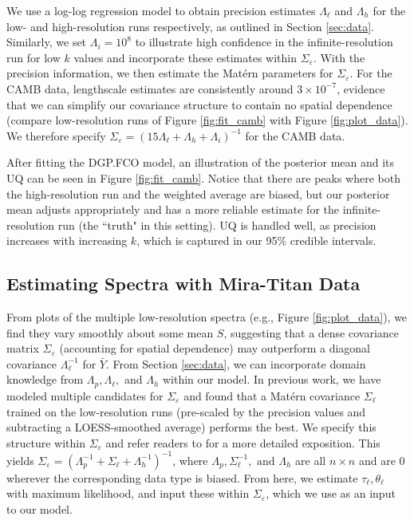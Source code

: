 \documentclass[11pt]{article}
\begin{document}
We use a log-log regression model to obtain precision estimates $\Lambda_\ell$ and $\Lambda_h$
for the low- and high-resolution runs respectively, as outlined in Section \ref{sec:data}. 
Similarly, we set $\Lambda_i=10^8$ to illustrate high confidence in the infinite-resolution 
run for low $k$ values and incorporate these estimates within $\Sigma_\varepsilon$. 
With the precision information, we then estimate the Mat\'ern parameters for 
$\Sigma_\varepsilon$. For the CAMB data, lengthscale estimates are consistently 
around $3\times 10^{-7}$, evidence that we can simplify our covariance structure 
to contain no spatial dependence (compare low-resolution runs of Figure \ref{fig:fit_camb} 
with Figure \ref{fig:plot_data}). We therefore specify $\Sigma_\varepsilon = 
(15\Lambda_\ell+\Lambda_h+\Lambda_i)^{-1}$ for the CAMB data.  

After fitting the DGP.FCO model, an illustration of the posterior mean and its UQ can
be seen in Figure \ref{fig:fit_camb}. Notice that there are peaks where both the high-resolution
run and the weighted average are biased, but our posterior mean adjusts appropriately 
and has a more reliable estimate for the infinite-resolution run (the ``truth" in this setting). 
UQ is handled well, as precision increases with increasing $k$, which is captured in our
95\% credible intervals.

\subsection{Estimating Spectra with Mira-Titan Data}
\label{subsec:mira_fit}

From plots of the multiple low-resolution spectra (e.g., Figure \ref{fig:plot_data}), 
we find they vary smoothly about some mean $S$, suggesting that a dense covariance 
matrix $\Sigma_\varepsilon$ (accounting for spatial dependence) may outperform a 
diagonal covariance $\Lambda_\ell^{-1}$ for $\bar Y$. From Section \ref{sec:data},
we can incorporate domain knowledge from $\Lambda_p, \Lambda_\ell,$ and $\Lambda_h$ 
within our model. In previous work, we have modeled multiple candidates for 
$\Sigma_\varepsilon$ \citep{walsh2023bayesian} and found that a Mat\'ern covariance 
$\Sigma_\ell$ trained on the low-resolution runs (pre-scaled by the precision 
values and subtracting a LOESS-smoothed average) performs the best. 
We specify this structure within $\Sigma_\varepsilon$ and refer readers 
to \cite{walsh2023bayesian} for a more detailed exposition. This yields 
$\Sigma_\varepsilon=\left(\Lambda_p^{-1} + \Sigma_\ell + \Lambda_h^{-1}\right)^{-1}$, 
where $\Lambda_p, \Sigma_\ell^{-1}, \text{ and } \Lambda_h$ are all $n\times n$ 
and are 0 wherever the corresponding data type is biased. From here, we estimate 
$\tau_\ell, \theta_\ell$ with maximum likelihood, and input these within 
$\Sigma_\varepsilon$, which we use as an input to our model.
\end{document}
